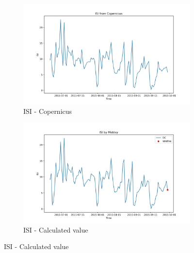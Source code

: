 \begin{figure}[h]
\caption{Comparison of ISI calculated values and Copernicus}
    \centering
    \begin{subfigure}{0.49\textwidth}
        \centering
        \includegraphics[width=\textwidth]{graphs/2015MesmoSitio/2015CopernicusISI12.png}
        \caption{ISI - Copernicus}
        \label{fig:isi_copernicus_2015_semfogo}
    \end{subfigure}
    \hfill
    \begin{subfigure}{0.49\textwidth}
        \centering
        \includegraphics[width=\textwidth]{graphs/2015MesmoSitio/2015CalcISI12.png}
        \caption{ISI - Calculated value}
        \label{fig:isi_calculated_2015_semfogo}
    \end{subfigure}
    \label{fig:comparison_isi_semfogo_copernicus_calculated}
\end{figure}

